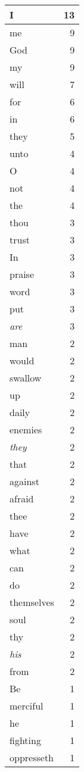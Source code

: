 \begin{center}
\begin{longtable}{l|r}
\hline \hline
\endlastfoot
I & 13 \\ \hline
me & 9 \\ \hline
God & 9 \\ \hline
my & 9 \\ \hline
will & 7 \\ \hline
for & 6 \\ \hline
in & 6 \\ \hline
they & 5 \\ \hline
unto & 4 \\ \hline
O & 4 \\ \hline
not & 4 \\ \hline
the & 4 \\ \hline
thou & 3 \\ \hline
trust & 3 \\ \hline
In & 3 \\ \hline
praise & 3 \\ \hline
word & 3 \\ \hline
put & 3 \\ \hline
\emph{are} & 3 \\ \hline
man & 2 \\ \hline
would & 2 \\ \hline
swallow & 2 \\ \hline
up & 2 \\ \hline
daily & 2 \\ \hline
enemies & 2 \\ \hline
\emph{they} & 2 \\ \hline
that & 2 \\ \hline
against & 2 \\ \hline
afraid & 2 \\ \hline
thee & 2 \\ \hline
have & 2 \\ \hline
what & 2 \\ \hline
can & 2 \\ \hline
do & 2 \\ \hline
themselves & 2 \\ \hline
soul & 2 \\ \hline
thy & 2 \\ \hline
\emph{his} & 2 \\ \hline
from & 2 \\ \hline
Be & 1 \\ \hline
merciful & 1 \\ \hline
he & 1 \\ \hline
fighting & 1 \\ \hline
oppresseth & 1 \\ \hline

\end{longtable}
\end{center}
